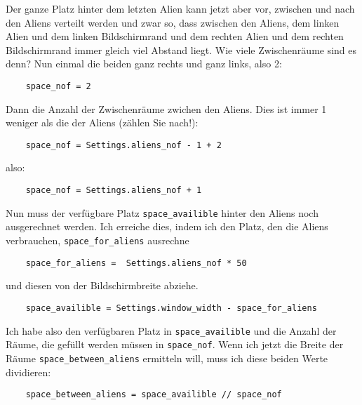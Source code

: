 

Der ganze Platz hinter dem letzten Alien kann jetzt aber vor, zwischen und nach den Aliens verteilt werden und zwar so, dass zwischen den Aliens, dem linken Alien und dem linken Bildschirmrand und dem rechten Alien und dem rechten Bildschirmrand immer gleich viel Abstand liegt. Wie viele Zwischenräume sind es denn? Nun einmal die beiden ganz rechts und ganz links, also 2:

\lstset{firstnumber=31}
\begin{lstlisting}
	space_nof = 2  
\end{lstlisting}

Dann die Anzahl der Zwischenräume zwichen den Aliens. Dies ist immer 1 weniger als die der Aliens (zählen Sie nach!):

\lstset{firstnumber=31}
\begin{lstlisting}
	space_nof = Settings.aliens_nof - 1 + 2
\end{lstlisting}

also:

\lstset{firstnumber=31}
\begin{lstlisting}
	space_nof = Settings.aliens_nof + 1     
\end{lstlisting}

Nun muss der verfügbare Platz \texttt{space\_availible} hinter den Aliens noch ausgerechnet werden. Ich erreiche dies, indem ich den Platz, den die Aliens verbrauchen, \texttt{space\_\-for\_\-a\-liens} ausrechne

\lstset{firstnumber=29}
\begin{lstlisting}
	space_for_aliens =  Settings.aliens_nof * 50     
\end{lstlisting}

und diesen von der Bildschirmbreite abziehe.
\lstset{firstnumber=30}
\begin{lstlisting}
	space_availible = Settings.window_width - space_for_aliens
\end{lstlisting}

Ich habe also den verfügbaren Platz in \texttt{space\_availible} und die Anzahl der Räume, die gefüllt werden müssen in \texttt{space\_nof}. Wenn ich jetzt die Breite der Räume \texttt{space\_between\_\-aliens} ermitteln will, muss ich diese beiden Werte dividieren:

\lstset{firstnumber=32}
\begin{lstlisting}
	space_between_aliens = space_availible // space_nof
\end{lstlisting}

